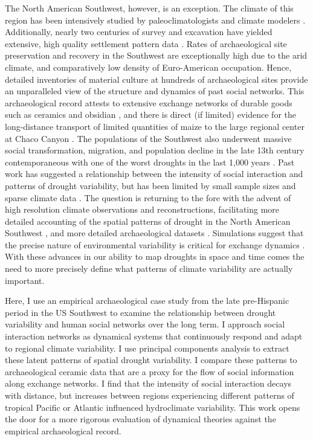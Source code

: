 \documentclass[11pt]{iopart}
\begin{document}
The North American Southwest, however, is an exception. The climate of this region has been intensively studied by paleoclimatologists and climate modelers \parencite{Cook1999,Sheppard2002,McCabe2004,Herweijer2007a, Cook2011,Bocinsky2014, Coats2015a, Ault2018}. Additionally, nearly two centuries of survey and excavation have yielded extensive, high quality settlement pattern data \parencite{Hill2004}. Rates of archaeological site preservation and recovery in the Southwest are exceptionally high due to the arid climate, and comparatively low density of Euro-American occupation. Hence, detailed inventories of material culture at hundreds of archaeological sites provide an unparalleled view of the structure and dynamics of past social networks. This archaeological record attests to extensive exchange networks of durable goods such as ceramics and obsidian \parencite{Malville2001,Taliaferro2010,Mills2013a}, and there is direct (if limited) evidence for the long-distance transport of limited quantities of maize to the large regional center at Chaco Canyon \parencite{Benson2009,Benson2010}. The populations of the Southwest also underwent massive social transformation, migration, and population decline in the late 13th century contemporaneous with one of the worst droughts in the last 1,000 years \parencite{Hill2004}. Past work has suggested a relationship between the intensity of social interaction and patterns of drought variability, but has been limited by small sample sizes and sparse climate data \parencite{Rautman1993a,Johnson1990ChumashAnalysis,Cordell2007}. The question is returning to the fore with the advent of high resolution climate observations and reconstructions, facilitating more detailed accounting of the spatial patterns of drought in the North American Southwest \parencite{Strawhacker2017RiskProvince}, and more detailed archaeological datasets \parencite{Borck2015}. Simulations suggest that the precise nature of environmental variability is critical for exchange dynamics \parencite{Freeman2014}. With these advances in our ability to map droughts in space and time comes the need to more precisely define what patterns of climate variability are actually important.

Here, I use an empirical archaeological case study from the late pre-Hispanic period in the US Southwest to examine the relationship between drought variability and human social networks over the long term. I approach social interaction networks as dynamical systems that continuously respond and adapt to regional climate variability. I use principal components analysis to extract these latent patterns of spatial drought variability. I compare these patterns to archaeological ceramic data that are a proxy for the flow of social information along exchange networks. I find that the intensity of social interaction decays with distance, but increases between regions experiencing different patterns of tropical Pacific or Atlantic influenced hydroclimate variability. This work opens the door for a more rigorous evaluation of dynamical theories against the empirical archaeological record.
\end{document}

